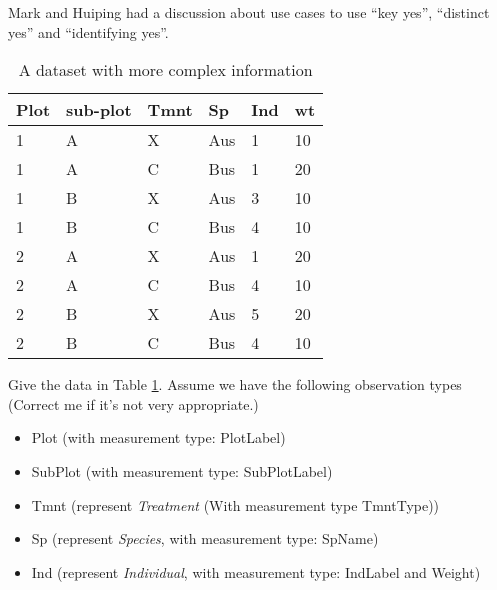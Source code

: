 \documentclass[10pt]{article}
\begin{document}
Mark and Huiping had a discussion about use cases to use ``key yes'', ``distinct yes'' and ``identifying yes''. 


\begin{table}
\begin{center}
\begin{tabular}{|l|l|l|l|l|l|}
\hline
Plot & sub-plot & Tmnt & Sp & Ind &wt\\\hline
1 & A & X &Aus&1&10\\\hline
1 & A & C &Bus&1&20\\\hline
1 & B & X &Aus&3&10\\\hline
1 & B & C &Bus&4&10\\\hline
2 & A & X &Aus&1&20\\\hline
2 & A & C &Bus&4&10\\\hline
2 & B & X &Aus&5&20\\\hline
2 & B & C &Bus&4&10\\\hline
\end{tabular}
\end{center}
\caption{A dataset with more complex information}
\label{tb:complexdb}
\end{table}

\noindent Give the data in Table \ref{tb:complexdb}. Assume we have the following observation types (Correct me if it's not very appropriate.)
\begin{itemize}
\item Plot (with measurement type: PlotLabel)
\item SubPlot (with measurement type: SubPlotLabel)
\item Tmnt (represent {\em Treatment} (With measurement type TmntType))
\item Sp (represent {\em Species}, with measurement type: SpName)
\item Ind (represent {\em Individual}, with measurement type: IndLabel and Weight)
\end{itemize} 
\end{document}
